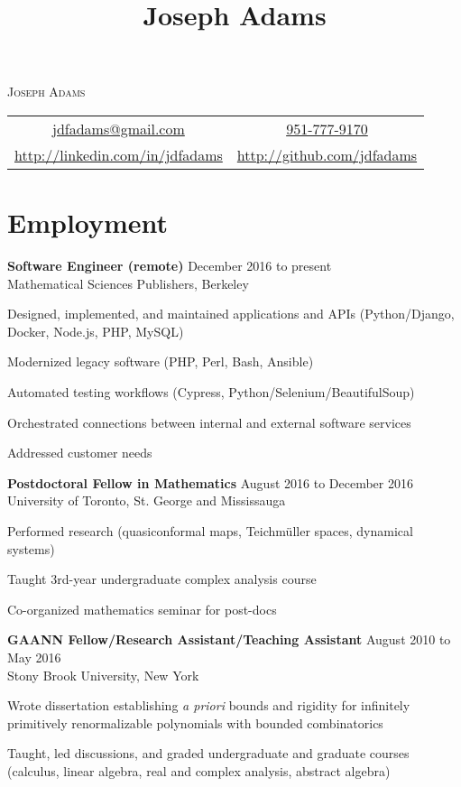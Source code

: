 \documentclass[11pt]{article}
\title{Joseph Adams}
\makeatletter
\newcommand\email{jdfadams@gmail.com}
\newcommand\phone{951-777-9170}
\makeatother
\begin{document}

\begin{center}
\textsc{\Large Joseph Adams} \\[1.5\baselineskip]
\begin{tabular}{c c}
\href{mailto:\email}{\email} & \href{tel:1-\phone}{\phone} \\
\url{http://linkedin.com/in/jdfadams} & \url{http://github.com/jdfadams}
\end{tabular}
\end{center}

\section*{Employment}
\noindent\textbf{Software Engineer (remote)} \hfill December 2016 to present\\
Mathematical Sciences Publishers, Berkeley\\
\begin{inparaitem}
\item Designed, implemented, and maintained applications and APIs (Python/Django, Docker, Node.js, PHP, MySQL)
\item Modernized legacy software (PHP, Perl, Bash, Ansible)
\item Automated testing workflows (Cypress, Python/Selenium/BeautifulSoup)
\item Orchestrated connections between internal and external software services
\item Addressed customer needs
\end{inparaitem}

\noindent\textbf{Postdoctoral Fellow in Mathematics} \hfill August 2016 to December 2016\\
University of Toronto, St. George and Mississauga\\
\begin{inparaitem}
\item Performed research (quasiconformal maps, Teichm\"{u}ller spaces, dynamical systems)
\item Taught 3rd-year undergraduate complex analysis course
\item Co-organized mathematics seminar for post-docs
\end{inparaitem}

\noindent\textbf{GAANN Fellow/Research Assistant/Teaching Assistant} \hfill August 2010 to May 2016\\
Stony Brook University, New York
\begin{inparaitem}
\item Wrote dissertation establishing \textit{a priori} bounds and rigidity for infinitely primitively renormalizable polynomials with bounded combinatorics
\item Taught, led discussions, and graded undergraduate and graduate courses (calculus, linear algebra, real and complex analysis, abstract algebra)
\end{inparaitem}
\end{document}
